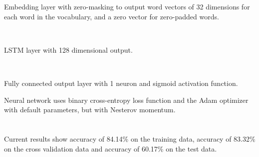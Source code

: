 \documentclass{report}
\begin{document}
     \hspace{-4.8cm}
     \setlength{\headsep}{0pt}
     \setlength{\voffset}{-1.5inch}
     \setlength{\headheight}{0pt}
     \setlength{\topmargin}{0pt}
     \\[+2cm]
     
     \setlength{\baselineskip}{+8mm}
     
     \\[-4mm]
     \begin{enumerate}
     	
     	{\fontsize{15}{18}\selectfont \item Embedding layer with zero-masking to output word vectors of 32 dimensions for each word in the vocabulary, and a zero vector for zero-padded words.}\\[-6mm]
     	
     	{\fontsize{15}{18}\selectfont \item LSTM layer with 128 dimensional output.}\\[-6mm]
     	
     	{\fontsize{15}{18}\selectfont \item Fully connected output layer with 1 neuron and sigmoid activation function.}
     	
     \end{enumerate}
     {\fontsize{15}{18}\selectfont Neural network uses binary cross-entropy loss function and the Adam optimizer with default parameters, but with Nesterov momentum.}\\[-3mm]
     
     \vspace{+9mm}\\[-9mm]
     \paragraph{}{\fontsize{15}{18}\selectfont Current results show accuracy of 84.14\% on the training data, accuracy of 83.32\% on the cross validation data and accuracy of 60.17\% on the test data.}
     
\end{document}
